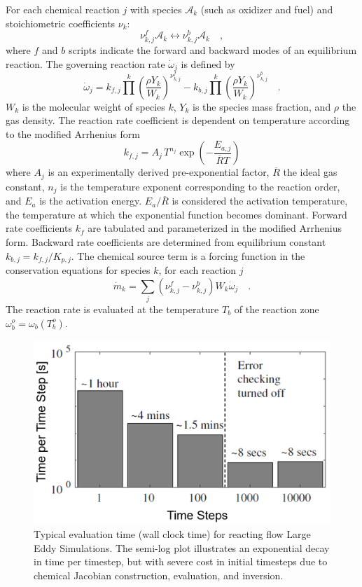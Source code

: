 \documentclass[letterpaper,twocolumn,10pt]{article}
\begin{document}
For each chemical reaction $j$ with species $\mathcal{A}_k$ (such as oxidizer and fuel) and stoichiometric coefficients $\nu_k$: 
$$\nu^f_{k,j} \mathcal{A}_k \leftrightarrow \nu^b_{k,j} \mathcal{A}_k \quad ,$$
where $f$ and $b$ scripts indicate the forward and backward modes of an equilibrium reaction. The governing reaction rate $\dot{\omega}_j$ is defined by
$$\dot{\omega}_j = k_{f,j} \prod^k (\frac{\rho Y_k}{W_k})^{\nu^f_{k,j}} - k_{b,j} \prod^k (\frac{\rho Y_k}{W_k})^{\nu^b_{k,j}} \quad .$$
$W_k$ is the molecular weight of species $k$, $Y_k$ is the species mass fraction, and $\rho$ the gas density. The reaction rate coefficient is dependent on temperature according to the modified Arrhenius form 
$$k_{f,j} = A_j \, T^{n_j} \exp(- \frac{E_{a,j}}{\overline{R} T}) $$
where $A_j$ is an experimentally derived pre-exponential factor, $\overline{R}$ the ideal gas constant, $n_j$ is the temperature exponent corresponding to the reaction order, and $E_a$ is the activation energy. $E_a / \overline{R}$ is considered the activation temperature, the temperature at which the exponential function becomes dominant. Forward rate coefficients $k_f$ are tabulated and parameterized in the modified Arrhenius form. Backward rate coefficients are determined from equilibrium constant $k_{b,j} = k_{f,j} / K_{p,j}$. The chemical source term is a forcing function in the conservation equations for species $k$, for each reaction $j$
$$\dot{m}_k = \sum_j (\nu^f_{k,j} - \nu^b_{k,j}) W_k \dot{\omega}_j \quad .$$
The reaction rate is evaluated at the temperature $T_b$ of the reaction zone $\omega_b^o = \omega_b (T_b^o)$.

\begin{figure}[h!]
    \centering
    \includegraphics[width=1.03\linewidth]{Figures/Intro_Load_Bar_Graph.PNG}
    \caption{Typical evaluation time (wall clock time) for reacting flow Large Eddy Simulations. The semi-log plot illustrates an exponential decay in time per timestep, but with severe cost in initial timesteps due to chemical Jacobian construction, evaluation, and inversion.}
    \label{fig:Intro}
\end{figure}
\end{document}
